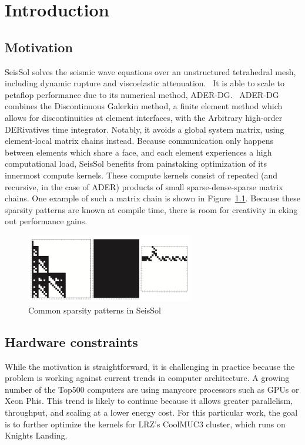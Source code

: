 \chapter{Introduction}
\label{chapter:Introduction}


\section{Motivation}

SeisSol solves the seismic wave equations over an unstructured tetrahedral mesh, including dynamic rupture and viscoelastic attenuation.~\cite{7568431} It is able to scale to petaflop performance due to its numerical method, ADER-DG.~\cite{GJI:GJI3193} ADER-DG combines the Discontinuous Galerkin method, a finite element method which allows for discontinuities at element interfaces, with the Arbitrary high-order DERivatives time integrator. Notably, it avoids a global system matrix, using element-local matrix chains instead. Because communication only happens between elements which share a face, and each element experiences a high computational load, SeisSol benefits from painstaking optimization of its innermost compute kernels. These compute kernels consist of repeated (and recursive, in the case of ADER) products of small sparse-dense-sparse matrix chains. One example of such a matrix chain is shown in Figure~\ref{fig:seissol_star}. Because these sparsity patterns are known at compile time, there is room for creativity in eking out performance gains.


\begin{figure}
  \centering
  \includegraphics[height=3cm]{images/seissol_visc.png}
  \caption{Common sparsity patterns in SeisSol}
  \label{fig:seissol_star}
\end{figure}

\section{Hardware constraints}
\label{section:knl}

While the motivation is straightforward, it is challenging in practice because the problem is working against current trends in computer architecture. A growing number of the Top500 computers are using manycore processors such as GPUs or Xeon Phis. This trend is likely to continue because it allows greater parallelism, throughput, and scaling at a lower energy cost. For this particular work, the goal is to further optimize the kernels for LRZ's CoolMUC3 cluster, which runs on Knights Landing.

